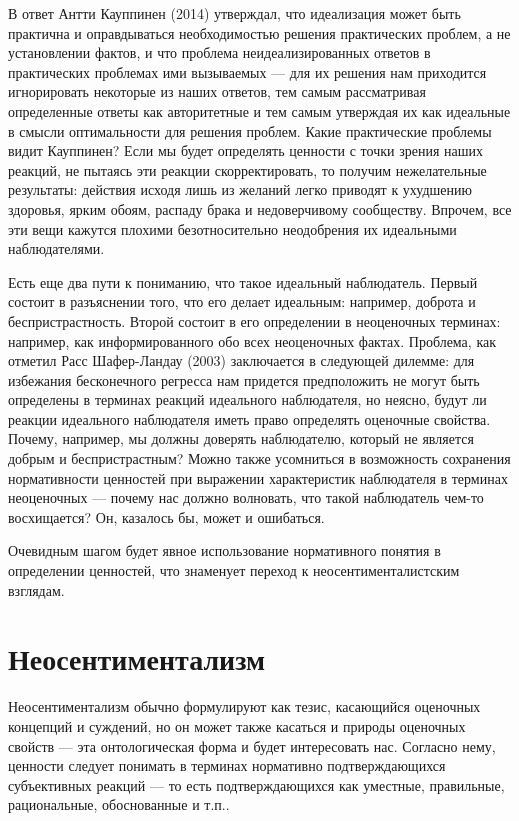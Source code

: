 \documentclass[11pt]{book}
\begin{document}
В ответ Антти Кауппинен (2014) утверждал, что идеализация может быть практична и оправдываться необходимостью решения практических проблем, а не установлении фактов, и что проблема неидеализированных ответов в практических проблемах ими вызываемых --- для их решения нам приходится игнорировать некоторые из наших ответов, тем самым рассматривая определенные ответы как авторитетные и тем самым утверждая их как идеальные в смысли оптимальности для решения проблем. Какие практические проблемы видит Кауппинен? Если мы будет определять ценности с точки зрения наших реакций, не пытаясь эти реакции скорректировать, то получим нежелательные результаты: действия исходя лишь из желаний легко приводят к ухудшению здоровья, ярким обоям, распаду брака и недоверчивому сообществу. Впрочем, все эти вещи кажутся плохими безотносительно неодобрения их идеальными наблюдателями.

Есть еще два пути к пониманию, что такое идеальный наблюдатель. Первый состоит в разъяснении того, что его делает идеальным: например, доброта и беспристрастность. Второй состоит в его определении в неоценочных терминах: например, как информированного обо всех неоценочных фактах. Проблема, как отметил Расс Шафер-Ландау (2003) заключается в следующей дилемме: для избежания бесконечного регресса нам придется предположить не могут быть определены в терминах реакций идеального наблюдателя, но неясно, будут ли реакции идеального наблюдателя иметь право определять оценочные свойства. Почему, например, мы должны доверять наблюдателю, который не является добрым и беспристрастным? Можно также усомниться в возможность сохранения нормативности ценностей при выражении характеристик наблюдателя в терминах неоценочных --- почему нас должно волновать, что такой наблюдатель чем-то восхищается? Он, казалось бы, может и ошибаться.

Очевидным шагом будет явное использование нормативного понятия в определении ценностей, что знаменует переход к неосентименталистским взглядам.

\section{Неосентиментализм}

Неосентиментализм обычно формулируют как тезис, касающийся оценочных концепций и суждений, но он может также касаться и природы оценочных свойств --- эта онтологическая форма и будет интересовать нас. Согласно нему, ценности следует понимать в терминах нормативно подтверждающихся субъективных реакций --- то есть подтверждающихся как уместные, правильные, рациональные, обоснованные и т.п..
\end{document}
